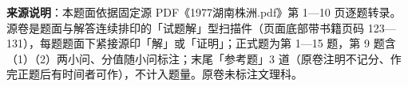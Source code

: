 


\begin{gktip}
\textbf{来源说明}：本题面依据固定源 PDF《1977湖南株洲.pdf》第 1—10 页逐题转录。源卷是题面与解答连续排印的「试题解」型扫描件（页面底部带书籍页码 123—131），每题题面下紧接源印「解」或「证明」；正式题为第 1—15 题，第 9 题含（1）（2）两小问、分值随小问标注；末尾「参考题」3 道（原卷注明不记分、作完正题后有时间者可作），不计入题量。原卷未标注文理科。
\end{gktip}

\par\medskip

